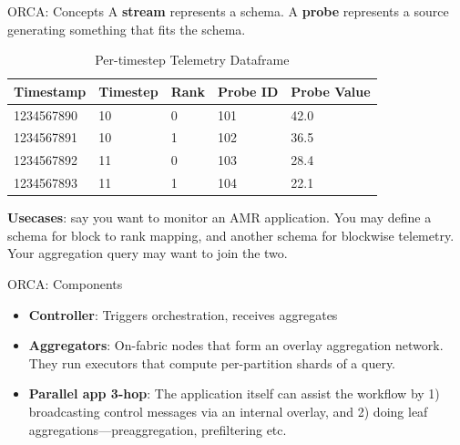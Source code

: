 \documentclass{beamer}
\begin{document}
\begin{frame}{ORCA: Concepts}
  A \textbf{stream} represents a schema. A \textbf{probe} represents a source generating something that fits the schema.

\begin{table}[h]
    \centering
    \begin{tabular}{|l|l|l|l|l|}
        \hline
        \textbf{Timestamp} & \textbf{Timestep} & \textbf{Rank} & \textbf{Probe ID} & \textbf{Probe Value} \\ \hline
        1234567890         & 10                & 0             & 101               & 42.0                 \\ \hline
        1234567891         & 10                & 1             & 102               & 36.5                 \\ \hline
        1234567892         & 11                & 0             & 103               & 28.4                 \\ \hline
        1234567893         & 11                & 1             & 104               & 22.1                 \\ \hline
    \end{tabular}
    \caption{Per-timestep Telemetry Dataframe}
    \label{tab:telemetry-data}
\end{table}

\textbf{Usecases}: say you want to monitor an AMR application. You may define a schema for block to rank mapping, and another schema for blockwise telemetry. Your aggregation query may want to join the two.
\end{frame}

\begin{frame}{ORCA: Components}
  \begin{itemize}
    \item \textbf{Controller}: Triggers orchestration, receives aggregates
    \item \textbf{Aggregators}: On-fabric nodes that form an overlay aggregation network. They run executors that compute per-partition shards of a query.
    \item \textbf{Parallel app 3-hop}: The application itself can assist the workflow by 1) broadcasting control messages via an internal overlay, and 2) doing leaf aggregations---preaggregation, prefiltering etc.
  \end{itemize}
\end{frame}
\end{document}
